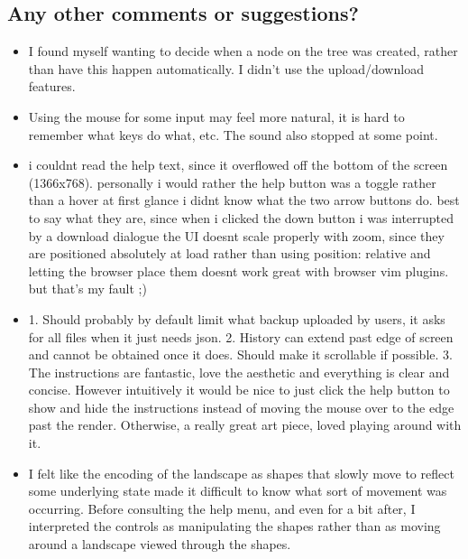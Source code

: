 \subsection{Any other comments or suggestions?}
\begin{itemize}
    \item I found myself wanting to decide when a node on the tree was created,
        rather than have this happen automatically. I didn't use the
        upload/download features.

    \item Using the mouse for some input may feel more natural, it is hard to
        remember what keys do what, etc. The sound also stopped at some point.

    \item i couldnt read the help text, since it overflowed off the bottom of
        the screen (1366x768). personally i would rather the help button was a
        toggle rather than a hover at first glance i didnt know what the two
        arrow buttons do. best to say what they are, since when i clicked the
        down button i was interrupted by a download dialogue the UI doesnt scale
        properly with zoom, since they are positioned absolutely at load rather
        than using position: relative and letting the browser place them doesnt
        work great with browser vim plugins. but that's my fault ;)

    \item 1. Should probably by default limit what backup uploaded by users, it
        asks for all files when it just needs json. 2. History can extend past
        edge of screen and cannot be obtained once it does. Should make it
        scrollable if possible. 3. The instructions are fantastic, love the
        aesthetic and everything is clear and concise. However intuitively it
        would be nice to just click the help button to show and hide the
        instructions instead of moving the mouse over to the edge past the
        render. Otherwise, a really great art piece, loved playing around with
        it.

    \item I felt like the encoding of the landscape as shapes that slowly move
        to reflect some underlying state made it difficult to know what sort of
        movement was occurring. Before consulting the help menu, and even for a
        bit after, I interpreted the controls as manipulating the shapes rather
        than as moving around a landscape viewed through the shapes.


\end{itemize}
